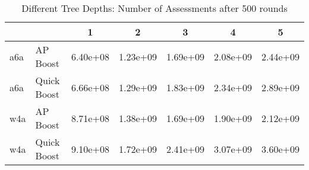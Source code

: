 \begin{table*}[ht]
\caption{Different Tree Depths: Number of Assessments after 500 rounds}
\label{DiffDepths}
\vskip 0.15in
\begin{center}
\begin{small}
\begin{sc}
\begin{tabular}{llccccc}
\toprule
 &  & 1 & 2 & 3 & 4 & 5\\
\midrule
a6a & AP Boost & 6.40e+08 & 1.23e+09 & 1.69e+09 & 2.08e+09 & 2.44e+09 \\
a6a & Quick Boost & 6.66e+08 & 1.29e+09 & 1.83e+09 & 2.34e+09 & 2.89e+09 \\
\midrule
w4a & AP Boost & 8.71e+08 & 1.38e+09 & 1.69e+09 & 1.90e+09 & 2.12e+09 \\
w4a & Quick Boost & 9.10e+08 & 1.72e+09 & 2.41e+09 & 3.07e+09 & 3.60e+09 \\
\bottomrule
\end{tabular}
\end{sc}
\end{small}
\end{center}
\vskip -0.1in
\end{table*}
